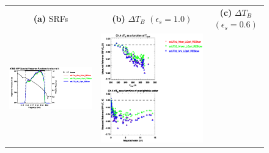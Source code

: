 \begin{figure}[H]
  \centering
  \begin{tabular}{c c c}
    \textsf{\textbf{(a)} SRFs} &
    \textsf{\textbf{(b)} $\Delta T_B$ $(\epsilon_s = 1.0)$} &
    \textsf{\textbf{(c)} $\Delta T_B$ $(\epsilon_s = 0.6)$} \\
    \includegraphics[bb=80 400 280 558,clip,scale=0.85]{graphics/srf/Vset/atms_npp.ch4.osrf.eps} &
    \includegraphics[bb=85 400 260 558,clip,scale=0.85]{graphics/dtb/Vset/e1.0_r0.0/atms_npp.ch4.dTb.eps} & 

\end{tabular}
\end{figure}
